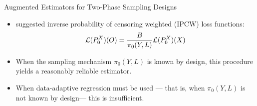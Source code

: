 \documentclass{beamer}
\begin{document}

\begin{frame}[c]{Augmented Estimators for Two-Phase Sampling Designs}

\begin{center}
\begin{itemize}
  \itemsep8pt
  \item \cite{rose2011targeted2sd} suggested inverse probability of censoring
    weighted (IPCW) loss functions:
    \begin{equation*}
      \mathcal{L}(P_0^X)(O) = \frac{B}{\pi_0(Y, L)}\mathcal{L}(P_0^X)(X)
    \end{equation*}
  \item When the sampling mechanism $\pi_0(Y,L)$ is known by design, this
    procedure yields a reasonably reliable estimator.
  \item When data-adaptive regression must be used --- that is, when
    $\pi_0(Y,L)$ is not known by design\footnotemark --- this is insufficient.
\end{itemize}
\end{center}

\note{
}


\end{frame}

\end{document}
